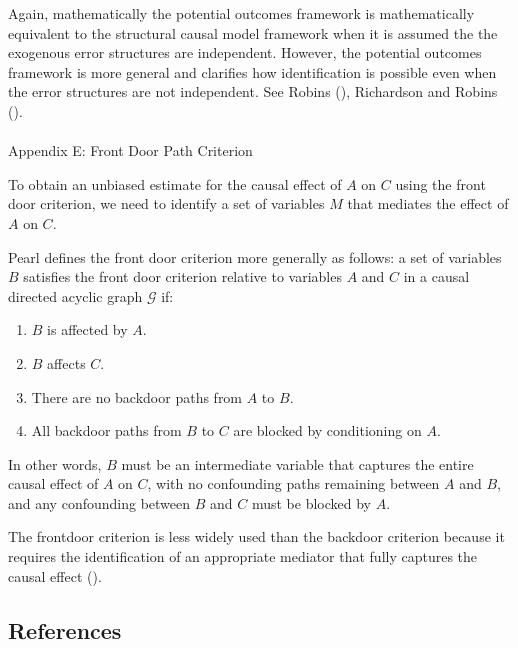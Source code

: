 \documentclass[
  single column]{article}
\makeatletter
\let\oldparagraph\paragraph
\renewcommand{\paragraph}{
    \@ifstar
      \xxxParagraphStar
      \xxxParagraphNoStar
  }
\newcommand{\xxxParagraphStar}[1]{\oldparagraph*{#1}\mbox{}}
\newcommand{\xxxParagraphNoStar}[1]{\oldparagraph{#1}\mbox{}}
\providecommand{\tightlist}{%
  \setlength{\itemsep}{0pt}\setlength{\parskip}{0pt}}\usepackage{longtable,booktabs,array}
\makeatother
\begin{document}
Again, mathematically the potential outcomes framework is mathematically
equivalent to the structural causal model framework when it is assumed
the the exogenous error structures are independent. However, the
potential outcomes framework is more general and clarifies how
identification is possible even when the error structures are not
independent. See Robins (), Richardson
and Robins ().

\newpage{}

\paragraph{Appendix E: Front Door Path Criterion}\label{id-app-e}

To obtain an unbiased estimate for the causal effect of \(A\) on \(C\)
using the front door criterion, we need to identify a set of variables
\(M\) that mediates the effect of \(A\) on \(C\).

Pearl defines the front door criterion more generally as follows: a set
of variables \(B\) satisfies the front door criterion relative to
variables \(A\) and \(C\) in a causal directed acyclic graph
\(\mathcal{G}\) if:

\begin{enumerate}
\def\labelenumi{\arabic{enumi}.}
\tightlist
\item
  \(B\) is affected by \(A\).
\item
  \(B\) affects \(C\).
\item
  There are no backdoor paths from \(A\) to \(B\).
\item
  All backdoor paths from \(B\) to \(C\) are blocked by conditioning on
  \(A\).
\end{enumerate}

In other words, \(B\) must be an intermediate variable that captures the
entire causal effect of \(A\) on \(C\), with no confounding paths
remaining between \(A\) and \(B\), and any confounding between \(B\) and
\(C\) must be blocked by \(A\).

The frontdoor criterion is less widely used than the backdoor criterion
because it requires the identification of an appropriate mediator that
fully captures the causal effect ().

\newpage{}

\subsection{References}\label{references}
\end{document}
